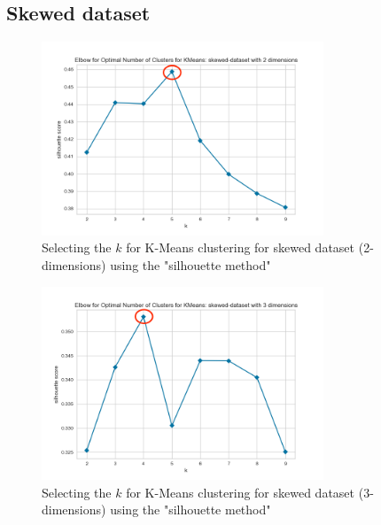 \subsection{Skewed dataset}
\begin{figure}[H]
  \includegraphics[width=0.75\textwidth]{Method/images/k-values/skewed-dataset-2-kmeans.png}
  \caption{Selecting the $k$ for K-Means clustering for skewed dataset (2-dimensions) using the "silhouette method"}
  \label{hyperparameters:agglomerative-skewed-dataset-2d}
\end{figure}
\begin{figure}[H]
  \includegraphics[width=0.75\textwidth]{Method/images/k-values/skewed-dataset-3-kmeans.png}
  \caption{Selecting the $k$ for K-Means clustering for skewed dataset (3-dimensions) using the "silhouette method"}
  \label{hyperparameters:agglomerative-skewed-dataset-3d}
\end{figure}
\newpage
